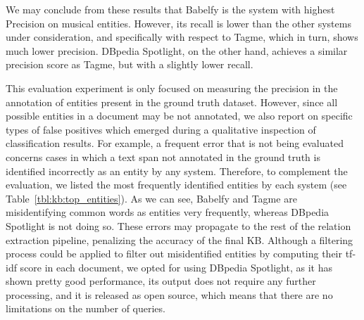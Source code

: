We may conclude from these results that Babelfy is the system with highest Precision on musical entities. However, its recall is lower than the other systems under consideration, and specifically with respect to Tagme, which in turn, shows much lower precision. DBpedia Spotlight, on the other hand, achieves a similar precision score as Tagme, but with a slightly lower recall. 

This evaluation experiment is only focused on measuring the precision in the annotation of entities present in the ground truth dataset. However, since all possible entities in a document may be not annotated, we also report on specific types of false positives which emerged during a qualitative inspection of classification results. For example, a frequent error that is not being evaluated concerns cases in which a text span not annotated in the ground truth is identified incorrectly as an entity by any system. Therefore, to complement the evaluation, we listed the most frequently identified entities by each system (see Table~\ref{tbl:kb:top_entities}). As we can see, Babelfy and Tagme are misidentifying common words as entities very frequently, whereas DBpedia Spotlight is not doing so. 
These errors may propagate to the rest of the relation extraction pipeline, penalizing the accuracy of the final KB.
Although a filtering process could be applied to filter out misidentified entities by computing their tf-idf score in each document, we opted for using DBpedia Spotlight, as it has shown pretty good performance, its output does not require any further processing, and it is released as open source, which means that there are no limitations on the number of queries.

